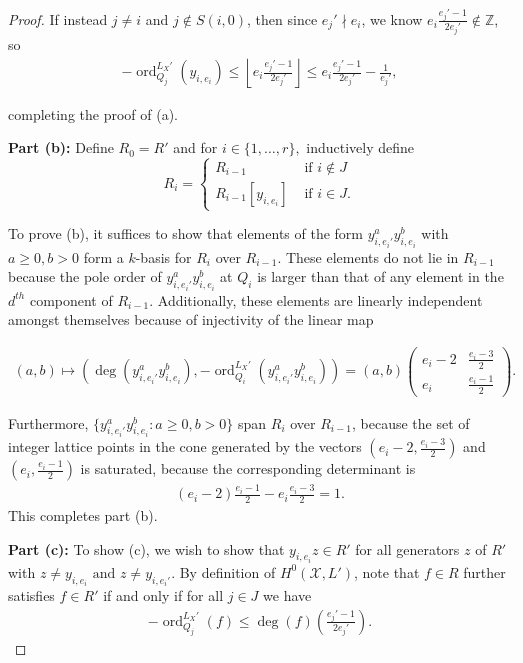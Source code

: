 \documentclass{amsart}
\theoremstyle{plain}
\theoremstyle{definition}
\theoremstyle{remark}
\numberwithin{equation}{section}
\newcommand\BZ{{\mathbb Z}}
\DeclareMathOperator{\ord}{ord}
\newcommand\sx{\mathscr X}
\newcommand \subhalf[1]{\frac{{#1} - 1}{2{#1}}}
\newcommand{\halfcan}{L}
\begin{document}
\begin{proof}
If instead $j\ne i$ and $j \notin S(i,0)$, then since $e_j' \nmid e_i$, we know
$e_i\subhalf{e_j'} \notin \BZ$, so
\begin{align*}
	-\ord_{Q_j}
^{\halfcan_X'}(y_{i, e_i}) \leq \left\lfloor  e_i\subhalf{e_j'} \right\rfloor 
	\leq e_i\subhalf{e_j'} - \frac{1}{e_j'},
\end{align*}

\noindent
completing the proof of (a).

{\bf Part (b):}
Define $R_0 = R'$ and for $i \in \{1, \ldots, r\},$ inductively define 
$$R_i = \begin{cases}
	R_{i - 1} &\text{ if }i \notin J\\
	R_{i - 1}[y_{i, e_i}] &\text{ if }i \in J. 
\end{cases}$$

\noindent
To prove (b), it suffices to show that elements of the form $y_{i, e_
i'}^ay_{i, e_i}^b$ with $a \geq 0, b > 0$ form a $k$-basis for $R_{i}$ over $R_{i-1}$. These elements do not lie in $R_{i - 1}$ because the pole order of $y_{i, e_i'}^ay_{i,e_i}^b$ at $Q_i$ is larger than that of any element in the $d^{th}$ component of $R_{i - 1}$. 
Additionally, these elements are linearly independent amongst themselves because of
injectivity of the linear map

\begin{align*}
	(a,b) \mapsto \left( \deg\left(y_{i, e_i'}^ay_{i, e_i}^b\right),-
	\ord_{Q_i}
^{\halfcan_X'}\left( y_{i, e_i'}^ay_{i, e_i}^b \right)  \right) = (a,b) 
	\begin{pmatrix}
		e_i -2 & \frac{e_i -3}{2} \\
		e_i	 & \frac{e_i - 1}{2}
	\end{pmatrix}.
\end{align*}

\noindent
Furthermore, $\{y_{i, e_i'}^a y_{i, e_i}^b:a \geq 0,
b > 0\}$ span $R_i$ over $R_{i - 1}$, because the set of
integer lattice points in the cone generated by the vectors $\left(e
_i -2, \frac{e_i -3}{2} \right)$ and $\left(e_i, \frac{e_i - 1}{2}
\right)$ is saturated, because the corresponding determinant is
\begin{align*}
	(e_i -2) \frac{e_i - 1}{2} - e_i \frac{e_i -3}{2} = 1.
\end{align*}
This completes part (b).

{\bf Part (c):}
To show (c), we wish to show that $y_{i, e_i}z \in R'$ for all generators $z$ of $R'$
with $z \neq y_{i, e_i} \text{ and } z \neq y_{i, e_i'}$. By definition of $H^0(\sx,\halfcan')$, note that $f \in R$ further satisfies $f \in R'$ if and
only if for all $j \in J$ we have
\begin{align}
\label{eqn:order-degree}
	-\ord_{Q_j}
^{\halfcan_X'}(f) \leq \deg (f) \left( \subhalf {e_j'} \right).
\end{align}


\end{proof}
\end{document}
